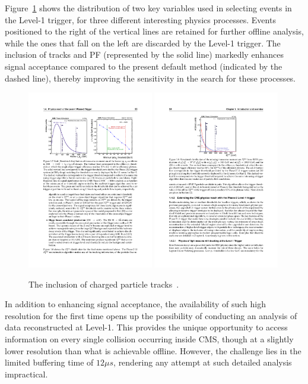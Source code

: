 \documentclass[12pt]{iopart}
\begin{document}
Figure~\ref{fig:phase2_physics} shows the distribution of two key variables used in selecting events in the Level-1 trigger, for three different interesting physics processes. Events positioned to the right of the vertical lines are retained for further offline analysis, while the ones that fall on the left are discarded by the Level-1 trigger. The inclusion of tracks and PF (represented by the solid line) markedly enhances signal acceptance compared to the present default method (indicated by the dashed line), thereby improving the sensitivity in the search for these processes.
\begin{figure}[h]
  \centering
  \includegraphics[width=0.49\textwidth]{figures/phase2_tauh.pdf}
  \includegraphics[width=0.49\textwidth]{figures/phase2_etmiss.pdf}
  \caption{The inclusion of charged particle tracks~\cite{tdr}.} %
  \label{fig:phase2_physics} %
\end{figure}
In addition to enhancing signal acceptance, the availability of such high resolution for the first time opens up the possibility of conducting an analysis of data reconstructed at Level-1. This provides the unique opportunity to access information on every single collision occurring inside CMS, though at a slightly lower resolution than what is achievable offline. However, the challenge lies in the limited buffering time of $12\mu s$, rendering any attempt at such detailed analysis impractical.
\end{document}
